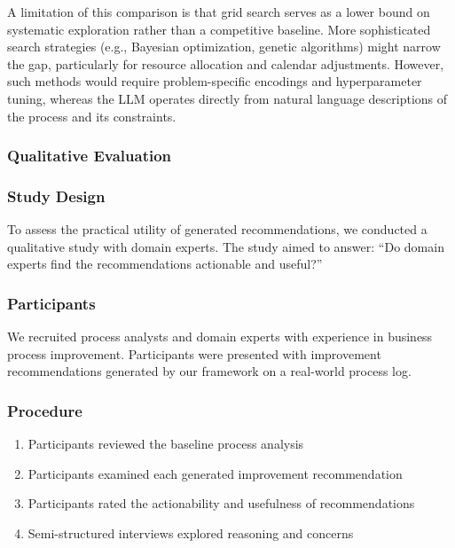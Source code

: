 \documentclass[preprint,12pt]{elsarticle}
\begin{document}
A limitation of this comparison is that grid search serves as a lower bound on systematic exploration rather than a competitive baseline. More sophisticated search strategies (e.g., Bayesian optimization, genetic algorithms) might narrow the gap, particularly for resource allocation and calendar adjustments. However, such methods would require problem-specific encodings and hyperparameter tuning, whereas the LLM operates directly from natural language descriptions of the process and its constraints.


\subsubsection{Qualitative Evaluation}
\label{sec:qualitative_res}

\subsubsection{Study Design}

To assess the practical utility of generated recommendations, we conducted a qualitative study with domain experts. The study aimed to answer: ``Do domain experts find the recommendations actionable and useful?''

\subsubsection{Participants}

We recruited process analysts and domain experts with experience in business process improvement. Participants were presented with improvement recommendations generated by our framework on a real-world process log.

\subsubsection{Procedure}

\begin{enumerate}
    \item Participants reviewed the baseline process analysis
    \item Participants examined each generated improvement recommendation
    \item Participants rated the actionability and usefulness of recommendations
    \item Semi-structured interviews explored reasoning and concerns
\end{enumerate}
\end{document}
